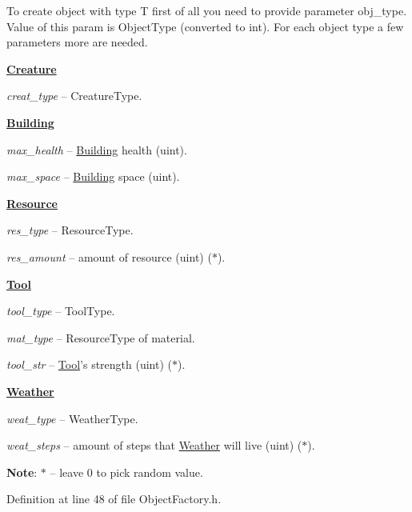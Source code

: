 To create object with type T first of all you need to provide parameter {\ttfamily obj\-\_\-type}. Value of this param is Object\-Type (converted to int). For each object type a few parameters more are needed.

{\bfseries \hyperlink{classCreature}{Creature}}
\begin{DoxyItemize}
\item {\itshape creat\-\_\-type} -- Creature\-Type.
\end{DoxyItemize}

{\bfseries \hyperlink{classBuilding}{Building}}
\begin{DoxyItemize}
\item {\itshape max\-\_\-health} -- \hyperlink{classBuilding}{Building} health (uint).
\item {\itshape max\-\_\-space} -- \hyperlink{classBuilding}{Building} space (uint).
\end{DoxyItemize}

{\bfseries \hyperlink{classResource}{Resource}}
\begin{DoxyItemize}
\item {\itshape res\-\_\-type} -- Resource\-Type.
\item {\itshape res\-\_\-amount} -- amount of resource (uint) ($\ast$).
\end{DoxyItemize}

{\bfseries \hyperlink{classTool}{Tool}}
\begin{DoxyItemize}
\item {\itshape tool\-\_\-type} -- Tool\-Type.
\item {\itshape mat\-\_\-type} -- Resource\-Type of material.
\item {\itshape tool\-\_\-str} -- \hyperlink{classTool}{Tool}'s strength (uint) ($\ast$).
\end{DoxyItemize}

{\bfseries \hyperlink{classWeather}{Weather}}
\begin{DoxyItemize}
\item {\itshape weat\-\_\-type} -- Weather\-Type.
\item {\itshape weat\-\_\-steps} -- amount of steps that \hyperlink{classWeather}{Weather} will live (uint) ($\ast$).
\end{DoxyItemize}

{\bfseries Note}\-: $\ast$ -- leave 0 to pick random value. 

Definition at line 48 of file Object\-Factory.\-h.



